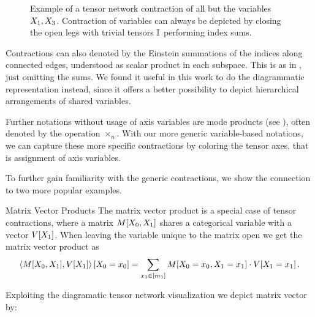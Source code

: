 
\begin{figure}
	\begin{center}
		
	\end{center}
	\caption{
		Example of a tensor network contraction of all but the variables $X_{1},X_{3}$.
		Contraction of variables can always be depicted by closing the open legs with trivial tensors $\mathbb{I}$ performing index sums.
	}\label{fig:contraction}
\end{figure}


\begin{remark}[Alternative Notations]
	Contractions can also denoted by the Einstein summations of the indices along connected edges, understood as scalar product in each subspace.
	This is as in , just omitting the sums.
	We found it useful in this work to do the diagrammatic representation instead, since it offers a better possibility to depict hierarchical arrangements of shared variables.
\end{remark}


Further notations without usage of axis variables are mode products (see \cite{kolda_tensor_2009,hackbusch_tensor_2012,cichocki_tensor_2015}), often denoted by the operation $\times_n$.
With our more generic variable-based notations, we can capture these more specific contractions by coloring the tensor axes, that is assignment of axis variables.

To further gain familiarity with the generic contractions, we show the connection to two more popular examples.

\begin{example}{Matrix Vector Products}\label{exa:matrixProduct}
	The matrix vector product is a special case of tensor contractions, where a matrix $M[X_{0},X_{1}]$ shares a categorical variable with a vector $V[X_{1}]$.
	When leaving the variable unique to the matrix open we get the matrix vector product as
		\[ \left\langle M[X_{0},X_{1}],V[X_{1}]\right\rangle \left[ X_{0}=x_{0} \right] = \sum_{x_{1}\in[m_{1}]} M[X_{0}=x_{0},X_{1}=x_{1}] \cdot V[X_{1}=x_{1}] \, .  \]

	Exploiting the diagramatic tensor network visualization we depict matrix vector by: %
	\begin{center}
		
	\end{center}
\end{example}

